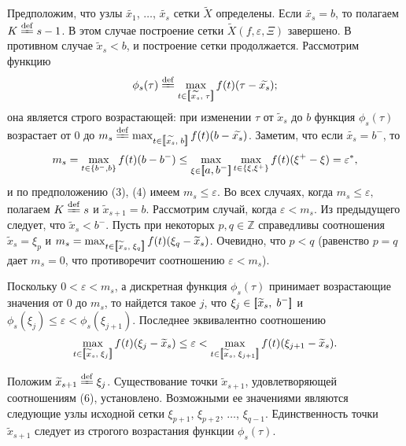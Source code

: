 \documentclass{spisok-article}
\begin{document}
    Предположим, что узлы $\widetilde{x_1}$, $\dots$, $\widetilde{x_s}$ сетки
    $\widetilde X$ определены. Если $\widetilde{x_s}=b$, то полагаем $K\stackrel{\rm def}{=\kern-3.6pt=} s-1$.
    В этом случае построение сетки $\widetilde{X}(f,\varepsilon,\Xi)$ завершено.
    В противном случае $\widetilde x_s<b$,
    и построение сетки продолжается. Рассмотрим функцию
    $$\phi_s(\tau)\stackrel{\rm def}{=\kern-3.6pt=}\max_{t\in\hbox{\rm$[\hspace{-2pt}[$}\widetilde{x_s},\;
      \tau\hbox{\rm$]\hspace{-2pt}]$}} f(t)(\tau-\widetilde{x_s});$$
    она  является строго возрастающей: при изменении $\tau$ от
     $\widetilde x_s$ до $b$ функция $\phi_s(\tau)$  возрастает от $0$ до
    $m_s\stackrel{\rm def}{=\kern-3.6pt=}\max_{t\in\hbox{\rm$[\hspace{-2pt}[$}\widetilde{x_s},\;
      b\hbox{\rm$]\hspace{-2pt}]$}} f(t)(b-\widetilde{x_s})$.
   Заметим, что если  $\widetilde{x_s}=b^-$, то
   $$m_s=\max_{t\in\{b^-,b\}}f(t)(b-b^-)\leq
   \max_{\xi\in\hbox{$[\hspace{-2pt}[$$a,b^-$$]\hspace{-2pt}]$}}
  \max_{t\in \{\xi,\xi^+\}}f(t)(\xi^+-\xi)=\varepsilon^*,
  $$
  и по предположению (3), (4) имеем $m_s\leq\varepsilon$.
   Во всех случаях, когда  $m_s\leq \varepsilon,$ полагаем
   $K\stackrel{\rm def}{=\kern-3.6pt=} s$ и  $\widetilde x_{s+1}=b$.
Рассмотрим случай, когда  $\varepsilon<m_s$. Из предыдущего следует,
    что $\widetilde x_s<b^-$. Пусть при
    некоторых  $p,q\in \mathbb Z$ справедливы соотношения
     $\widetilde x_s=\xi_p$ и
    $m_s= \max_{t\in\hbox{\rm$[\hspace{-2pt}[$}\widetilde x_s,\;
      \xi_q\hbox{\rm$]\hspace{-2pt}]$}} f(t)(\xi_q-\widetilde x_s)$.
      Очевидно, что $p<q$ (равенство
    $p=q$ дает $m_s=0$, что противоречит соотношению
    $\varepsilon<m_s$).

    Поскольку $0<\varepsilon<m_s$, а дискретная функция $\phi_s(\tau)$ принимает
    возрастающие значения от $0$   до $m_s$, то найдется такое
    $j$,  что $\xi_j\in\hbox{\rm$[\hspace{-2pt}[$}\widetilde x_s,\;
      b^-\hbox{\rm$]\hspace{-2pt}]$}$ и $\phi_s(\xi_j)\leq
      \varepsilon<\phi_s(\xi_{j+1})$. Последнее эквивалентно
      соотношению
        $$\max_{t\in\hbox{\rm$[\hspace{-2pt}[$}\widetilde x_s,\;
        \xi_j\hbox{\rm$]\hspace{-2pt}]$}} f(t)
    (\xi_j-\widetilde x_s)\leq\varepsilon
    <\max_{t\in\hbox{\rm$[\hspace{-2pt}[$}\widetilde x_s,\;
        \xi_{j+1}\hbox{\rm$]\hspace{-2pt}]$}} f(t)
    (\xi_{j+1}-\widetilde x_s).
    $$

    Положим $\widetilde x_{s+1}\stackrel{\rm def}{=\kern-3.6pt=}\xi_j$.
    Существование  точки  $\widetilde x_{s+1}$,
    удовлетворяющей соотношениям (6),
    установлено. Возможными ее значениями являются
    следующие узлы исходной сетки $\xi_{p+1}$, $\xi_{p+2}$,
    $\dots$,  $\xi_{q-1}$.  Единственность точки
     $\widetilde x_{s+1}$ следует из строгого возрастания функции
   $\phi_s(\tau)$.
\end{document}
